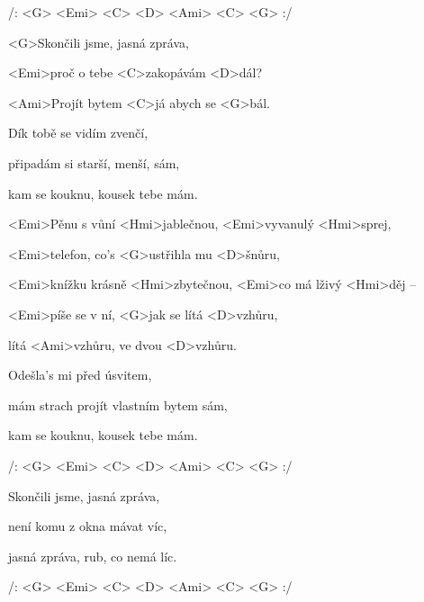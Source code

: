 

/: <G> <Emi> <C> <D> <Ami> <C> <G> :/

\zs
<G>Skončili jsme, jasná zpráva,

<Emi>proč o tebe <C>zakopávám <D>dál?

<Ami>Projít bytem <C>já abych se <G>bál.
\ks

\zs
Dík tobě se vidím zvenčí,

připadám si starší, menší, sám,

kam se kouknu, kousek tebe mám.
\ks

\zr
<Emi>Pěnu s vůní <Hmi>jablečnou, <Emi>vyvanulý <Hmi>sprej,

<Emi>telefon, co's <G>ustřihla mu <D>šnůru,

<Emi>knížku krásně <Hmi>zbytečnou, <Emi>co má lživý <Hmi>děj --

<Emi>píše se v ní, <G>jak se lítá <D>vzhůru,

lítá <Ami>vzhůru, ve dvou <D>vzhůru.
\kr

\zs
Odešla's mi před úsvitem,

mám strach projít vlastním bytem sám,

kam se kouknu, kousek tebe mám.
\ks

/: <G> <Emi> <C> <D> <Ami> <C> <G> :/

\zr\kr

\zs
Skončili jsme, jasná zpráva,

není komu z okna mávat víc,

jasná zpráva, rub, co nemá líc.
\ks

/: <G> <Emi> <C> <D> <Ami> <C> <G> :/

\kp
